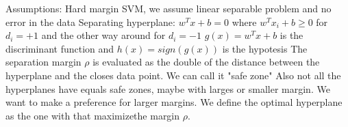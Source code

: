 \documentclass[12pt]{book}
\begin{document}
Assumptions: Hard margin SVM, we assume linear separable problem and no error in the data
\newline\newline
Separating hyperplane: $w^T x + b = 0$ \newline where $w^T x_i + b \geq 0$ for $d_i = +1$ and the other way around for $d_i = -1$
\clearpage
$g(x) = w^T x + b$ is the discriminant function and $h(x) = sign(g(x))$ is the hypotesis
\newline\newline
The separation margin $\rho$ is evaluated as the double of the distance between the hyperplane and the closes data point. We can call it "safe zone"
\newline\newline
Also not all the hyperplanes have equals safe zones, maybe with larges or smaller margin. We want to make a preference for larger margins.
\newline\newline
We define the optimal hyperplane as the one with that maximizethe margin $\rho$.
\end{document}
